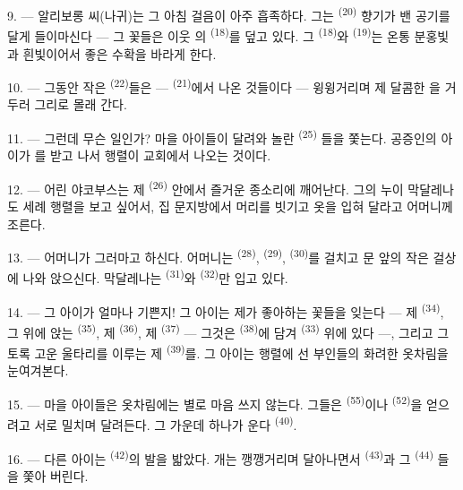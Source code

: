 \VUsaut{4.0mm}
\VUsaut{3.4mm}

9. --- 알리보롱 씨(나귀)는 그 아침 걸음이 아주 흡족하다. 그는 
\textsuperscript{(20)} 향기가 밴 공기를 달게 들이마신다 — 그 꽃들은 이웃
의  \textsuperscript{(18)}를 덮고 있다. 그
 \textsuperscript{(18)}와  \textsuperscript{(19)}는
온통 분홍빛과 흰빛이어서 좋은 수확을 바라게 한다.

10. --- 그동안 작은  \textsuperscript{(22)}들은 — 
\textsuperscript{(21)}에서 나온 것들이다 — 윙윙거리며 제 달콤한 을 거두러
그리로 몰래 간다.

11. --- 그런데 무슨 일인가? 마을 아이들이 달려와 놀란  \textsuperscript{(25)}
들을 쫓는다. 공증인의 아이가 를 받고 나서 행렬이 교회에서 나오는 것이다.

12. --- 어린 야코부스는 제  \textsuperscript{(26)} 안에서 즐거운 종소리에
깨어난다. 그의 누이 막달레나도 세례 행렬을 보고 싶어서, 집 문지방에서 머리를 빗기고 옷을
입혀 달라고 어머니께 조른다.

13. --- 어머니가 그러마고 하신다. 어머니는  \textsuperscript{(28)},
 \textsuperscript{(29)},  \textsuperscript{(30)}를 걸치고
문 앞의 작은 걸상에 나와 앉으신다. 막달레나는  \textsuperscript{(31)}와
 \textsuperscript{(32)}만 입고 있다.

14. --- 그 아이가 얼마나 기쁜지! 그 아이는 제가 좋아하는 꽃들을 잊는다 — 제
 \textsuperscript{(34)}, 그 위에 앉는  \textsuperscript{(35)},
제  \textsuperscript{(36)}, 제  \textsuperscript{(37)} —
그것은  \textsuperscript{(38)}에 담겨  \textsuperscript{(33)} 위에
있다 —, 그리고 그토록 고운 울타리를 이루는 제  \textsuperscript{(39)}를.
그 아이는 행렬에 선 부인들의 화려한 옷차림을 눈여겨본다.

15. --- 마을 아이들은 옷차림에는 별로 마음 쓰지 않는다. 그들은 
\textsuperscript{(55)}이나  \textsuperscript{(52)}을 얻으려고 서로 밀치며
달려든다. 그 가운데 하나가 운다 \textsuperscript{(40)}.

16. --- 다른 아이는  \textsuperscript{(42)}의 발을 밟았다. 개는 깽깽거리며
달아나면서  \textsuperscript{(43)}과 그  \textsuperscript{(44)}
들을 쫓아 버린다.

